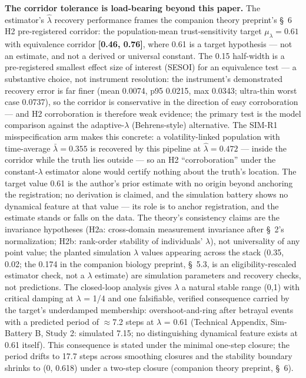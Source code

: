 \documentclass[
]{article}
\begin{document}
\textbf{The corridor tolerance is load-bearing beyond this paper.} The
estimator's \(\hat{\lambda}\) recovery performance frames the companion
theory preprint's §~6 H2 pre-registered corridor: the population-mean
trust-sensitivity target \(\mu_{\lambda} = 0.61\) with equivalence
corridor \textbf{{[}0.46, 0.76{]}}, where 0.61 is a target hypothesis
--- not an estimate, and not a derived or universal constant. The 0.15
half-width is a pre-registered smallest effect size of interest (SESOI)
for an equivalence test --- a substantive choice, not instrument
resolution: the instrument's demonstrated recovery error is far finer
(mean 0.0074, p95 0.0215, max 0.0343; ultra-thin worst case 0.0737), so
the corridor is conservative in the direction of easy corroboration ---
and H2 corroboration is therefore weak evidence; the primary test is the
model comparison against the adaptive-\(\lambda\) (Behrens-style)
alternative. The SIM-R1 misspecification arm makes this concrete: a
volatility-linked population with time-average \(\bar{\lambda} = 0.355\)
is recovered by this pipeline at \(\hat{\lambda} = 0.472\) --- inside
the corridor while the truth lies outside --- so an H2 ``corroboration''
under the constant-\(\lambda\) estimator alone would certify nothing
about the truth's location. The target value 0.61 is the author's prior
estimate with no origin beyond anchoring the registration; no derivation
is claimed, and the simulation battery shows no dynamical feature at
that value --- its role is to anchor registration, and the estimate
stands or falls on the data. The theory's consistency claims are the
invariance hypotheses (H2a: cross-domain measurement invariance after
§~2's normalization; H2b: rank-order stability of individuals'
\(\lambda\)), not universality of any point value; the planted
simulation \(\lambda\) values appearing across the stack (0.35, 0.02;
the 0.174 in the companion biology preprint, §~5.3, is an
eligibility-rescaled estimator check, not a \(\lambda\) estimate) are
simulation parameters and recovery checks, not predictions. The
closed-loop analysis gives \(\lambda\) a natural stable range (0,1) with
critical damping at \(\lambda\) = 1/4 and one falsifiable, verified
consequence carried by the target's underdamped membership:
overshoot-and-ring after betrayal events with a predicted period of
\(\approx\)7.2 steps at \(\lambda\) = 0.61 (Technical Appendix,
Sim-Battery B, Study 2: simulated 7.15; no distinguishing dynamical
feature exists at 0.61 itself). This consequence is stated under the
minimal one-step closure; the period drifts to 17.7 steps across
smoothing closures and the stability boundary shrinks to (0, 0.618)
under a two-step closure (companion theory preprint, §~6).
\end{document}
